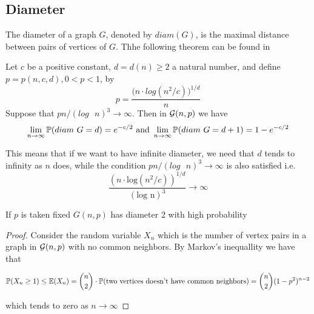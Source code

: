 



\subsection{Diameter}

The diameter of a graph $G$, denoted by $diam(G)$, is the maximal distance between pairs of vertices of $G$. Thhe following theorem can be found in \cite[Bollobás, p.259]{Bollobas}

\begin{theorem}
Let $c$ be a positive constant, $d=d(n)\geq 2$ a natural number, and define $p=p(n,c,d), 0<p<1$, by
$$p = \frac{\big( n\cdot log(n^2/c)\big) ^{1/d}}{n}$$
Suppose that $pn/(log\text{ }n)^{3} \to \infty$. Then in $\G(n,p)$ we have
$$\lim_{n\to \infty} \P (diam\text{ }G = d) = e^{-c/2} \text{ and }  \lim_{n\to \infty} \P (diam\text{ }G = d+1) = 1 - e^{-c/2}$$
\end{theorem}

This means that if we want to have infinite diameter, we need that $d$ tends to infinity as $n$ does, while the condition $pn/(log\text{ }n)^{3} \to \infty$ is also satisfied i.e.
$$ \frac{(n\cdot\text{log}(n^{2}/c))^{1/d}}{(\text{log n})^{3}} \to \infty$$

  

\begin{theorem}
If $p$ is taken fixed $G(n,p)$ has diameter 2 with high probability 
\end{theorem}

\begin{proof}
Consider the random variable $X_{n}$ which is the number of vertex pairs in a graph in $\G(n,p)$ with no common neighbors. By Markov's inequallity we have that

$$\P(X_{n} \geq 1)\leq \E(X_{n}) = \binom{n}{2} \cdot \P(\text{two vertices doesn't have common neighbors}) = \binom{n}{2} (1-p^{2})^{n-2}$$

which tends to zero as $n\to \infty$
\end{proof}



